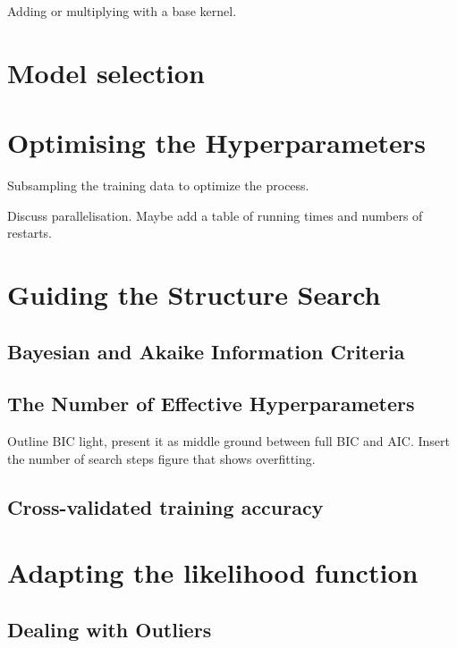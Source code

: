 \documentclass[a4paper,12pt ]{report}
\begin{document}
Adding or multiplying with a base kernel. 

\section{Model selection}

\section{Optimising the Hyperparameters}

Subsampling the training data to optimize the process. 

Discuss parallelisation. Maybe add a table of running times and numbers of restarts. 

\section{Guiding the Structure Search}

\subsection{Bayesian and Akaike Information Criteria}

\subsection{The Number of Effective Hyperparameters}

Outline BIC light, present it as middle ground between full BIC and AIC. 
Insert the number of search steps figure that shows overfitting. 

\subsection{Cross-validated training accuracy}




\section{Adapting the likelihood function}

\subsection{Dealing with Outliers}
\end{document}
